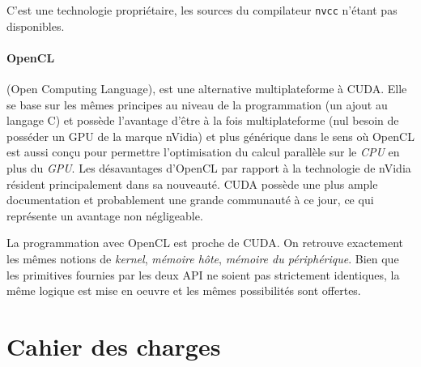 C'est une technologie propriétaire, les sources du compilateur {\tt nvcc} n'étant pas disponibles.

\paragraph{OpenCL}
(Open Computing Language), est une alternative multiplateforme à CUDA. Elle se base sur les mêmes principes au niveau  de la programmation (un ajout au langage C) et possède l'avantage d'être à la fois multiplateforme (nul besoin de posséder un GPU de la marque nVidia) et plus générique dans le sens où OpenCL est aussi conçu pour permettre l'optimisation du calcul parallèle sur le \emph{CPU} en plus du \emph{GPU}. Les désavantages d'OpenCL par rapport à la technologie de nVidia résident principalement dans sa nouveauté. CUDA possède une plus ample documentation et probablement une grande communauté à ce jour, ce qui représente un avantage non négligeable.

La programmation avec OpenCL est proche de CUDA. On retrouve exactement les mêmes notions de \emph{kernel}, \emph{mémoire hôte}, \emph{mémoire du périphérique}. Bien que les primitives fournies par les deux API ne soient pas strictement identiques, la même logique est mise en oeuvre et les mêmes possibilités sont offertes.

\section{Cahier des charges}
